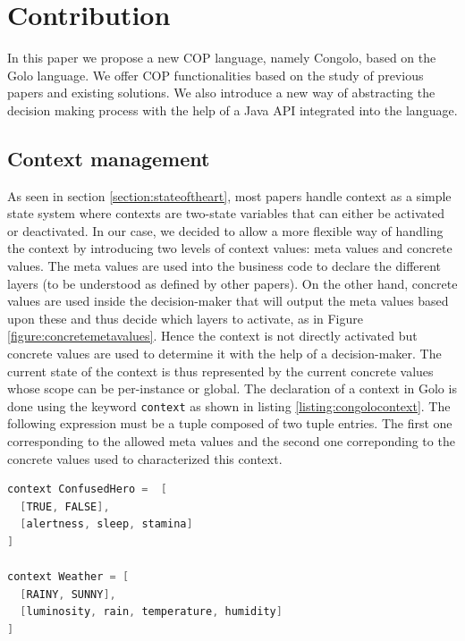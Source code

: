\documentclass[a4paper]{article}
\begin{document}
  \section{Contribution}

\label{section:contribution}

In this paper we propose a new COP language, namely Congolo, based on the Golo language. We offer COP functionalities based on the study of previous papers and existing solutions. We also introduce a new way of abstracting the decision making process with the help of a Java API integrated into the language.
\subsection{Context management}
\label{subsection:contextmanagement}

As seen in section \ref{section:stateoftheart}, most papers handle context as a simple state system where contexts are two-state variables that can either be activated or deactivated. In our case, we decided to allow a more flexible way of handling the context by introducing two levels of context values: meta values and concrete values. The meta values are used into the business code to declare the different layers (to be understood as defined by other papers). On the other hand, concrete values are used inside the decision-maker that will output the meta values based upon these and thus decide which layers to activate, as in Figure \ref{figure:concretemetavalues}. Hence the context is not directly activated but concrete values are used to determine it with the help of a decision-maker. The current state of the context is thus represented by the current concrete values whose scope can be per-instance or global. The declaration of a context in Golo is done using the keyword \lstinline|context| as shown in listing \ref{listing:congolocontext}. The following expression must be a tuple composed of two tuple entries. The first one corresponding to the allowed meta values and the second one correponding to the concrete values used to characterized this context.

\begin{lstlisting}[float, language=Java, caption=ConGolo context example, label={listing:congolocontext}]
context ConfusedHero =  [
  [TRUE, FALSE],
  [alertness, sleep, stamina]
]

context Weather = [
  [RAINY, SUNNY],
  [luminosity, rain, temperature, humidity]
]
\end{lstlisting}
\end{document}
